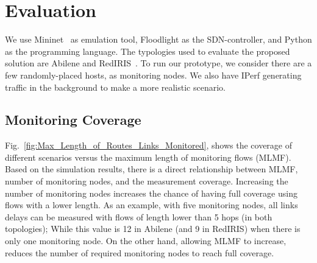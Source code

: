 \documentclass[10pt, journal, letterpaper]{IEEEtran}
\begin{document}
\section{Evaluation}\label{sec:evaluation}
We use Mininet~\cite{kaur2014mininet} as emulation tool, Floodlight as the SDN-controller, and Python as the programming language. The typologies used to evaluate the proposed solution are Abilene and RedIRIS~\cite{topologyzoo}. To run our prototype, we consider there are a few randomly-placed hosts, as monitoring nodes. We also have IPerf generating traffic in the background to make a more realistic scenario.%



\subsection{Monitoring Coverage}\label{subsec:eval_coverage}
Fig.~\ref{fig:Max_Length_of_Routes_Links_Monitored}, shows the coverage of different scenarios versus the maximum length of monitoring flows (MLMF). Based on the simulation results, there is a direct relationship between MLMF, number of monitoring nodes, and the measurement coverage. Increasing the number of monitoring nodes increases the chance of having full coverage using flows with a lower length. As an example, with five monitoring nodes, all links delays can be measured with flows of length lower than 5 hops (in both topologies); While this value is 12 in Abilene (and 9 in RedIRIS) when there is only one monitoring node.
On the other hand, allowing MLMF to increase, reduces the number of required monitoring nodes to reach full coverage. 
\end{document}
